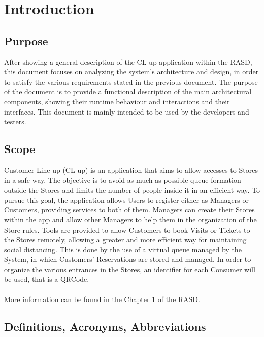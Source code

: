 \documentclass[a4paper, 12pt, oneside, table]{article}
\begin{document}
\normalsize


\newpage
\tableofcontents
\newpage

\section{Introduction}
\subsection{Purpose}
After showing a general description of the CL-up application within the RASD, this document focuses on analyzing the system's architecture and design, in order to satisfy the various requirements stated in the previous document. The purpose of the document is to provide a functional description of the main architectural components, showing their runtime behaviour and interactions and their interfaces. This document is mainly intended to be used by the developers and testers.

\subsection{Scope}
Customer Line-up (CL-up) is an application that aims to allow accesses to Stores in a safe way. The objective is to avoid as much as possible queue formation outside the Stores and limits the number of people inside it in an efficient way. To pursue this goal, the application allows Users to register either as Managers or Customers, providing services to both of them. Managers can create their Stores within the app and allow other Managers to help them in the organization of the Store rules. Tools are provided to allow Customers to book Visits or Tickets to the Stores remotely, allowing a greater and more efficient way for maintaining social distancing. This is done by the use of a virtual queue managed by the System, in which Customers' Reservations are stored and managed. In order to organize the various entrances in the Stores, an identifier for each Consumer will be used, that is a QRCode.\\ %
\\
More information can be found in the Chapter 1 of the RASD.
\subsection{Definitions, Acronyms, Abbreviations}
\end{document}
